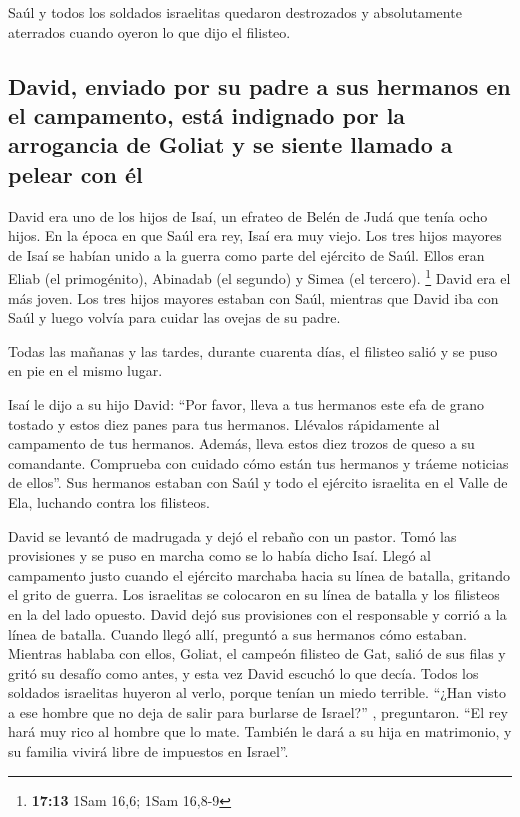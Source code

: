  Saúl y todos los soldados israelitas quedaron
destrozados y absolutamente aterrados cuando oyeron lo que dijo el
filisteo.

\hypertarget{david-enviado-por-su-padre-a-sus-hermanos-en-el-campamento-estuxe1-indignado-por-la-arrogancia-de-goliat-y-se-siente-llamado-a-pelear-con-uxe9l}{%
\subsection{David, enviado por su padre a sus hermanos en el campamento,
está indignado por la arrogancia de Goliat y se siente llamado a pelear
con
él}\label{david-enviado-por-su-padre-a-sus-hermanos-en-el-campamento-estuxe1-indignado-por-la-arrogancia-de-goliat-y-se-siente-llamado-a-pelear-con-uxe9l}}

 David era uno de los hijos de Isaí, un efrateo de Belén
de Judá que tenía ocho hijos. En la época en que Saúl era rey, Isaí era
muy viejo.  Los tres hijos mayores de Isaí se habían
unido a la guerra como parte del ejército de Saúl. Ellos eran Eliab (el
primogénito), Abinadab (el segundo) y Simea (el tercero). \footnote{\textbf{17:13}
  1Sam 16,6; 1Sam 16,8-9}  David era el más joven. Los
tres hijos mayores estaban con Saúl,  mientras que David
iba con Saúl y luego volvía para cuidar las ovejas de su padre.

 Todas las mañanas y las tardes, durante cuarenta días,
el filisteo salió y se puso en pie en el mismo lugar.

 Isaí le dijo a su hijo David: ``Por favor, lleva a tus
hermanos este efa de grano tostado y estos diez panes para tus hermanos.
Llévalos rápidamente al campamento de tus hermanos. 
Además, lleva estos diez trozos de queso a su comandante. Comprueba con
cuidado cómo están tus hermanos y tráeme noticias de ellos''.
 Sus hermanos estaban con Saúl y todo el ejército
israelita en el Valle de Ela, luchando contra los filisteos.

 David se levantó de madrugada y dejó el rebaño con un
pastor. Tomó las provisiones y se puso en marcha como se lo había dicho
Isaí. Llegó al campamento justo cuando el ejército marchaba hacia su
línea de batalla, gritando el grito de guerra.  Los
israelitas se colocaron en su línea de batalla y los filisteos en la del
lado opuesto.  David dejó sus provisiones con el
responsable y corrió a la línea de batalla. Cuando llegó allí, preguntó
a sus hermanos cómo estaban.  Mientras hablaba con ellos,
Goliat, el campeón filisteo de Gat, salió de sus filas y gritó su
desafío como antes, y esta vez David escuchó lo que decía.
 Todos los soldados israelitas huyeron al verlo, porque
tenían un miedo terrible.  ``¿Han visto a ese hombre que
no deja de salir para burlarse de Israel?'' , preguntaron. ``El rey hará
muy rico al hombre que lo mate. También le dará a su hija en matrimonio,
y su familia vivirá libre de impuestos en Israel''.

